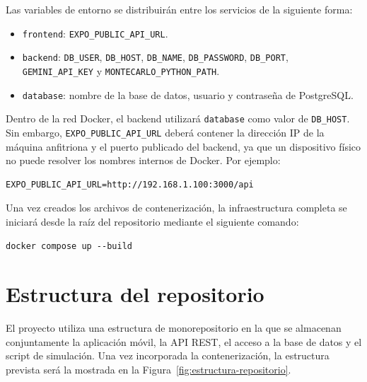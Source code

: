 Las variables de entorno se distribuir\'an entre los servicios de la siguiente
forma:

\begin{itemize}
  \item \texttt{frontend}: \texttt{EXPO\_PUBLIC\_API\_URL}.
  \item \texttt{backend}: \texttt{DB\_USER}, \texttt{DB\_HOST},
        \texttt{DB\_NAME}, \texttt{DB\_PASSWORD}, \texttt{DB\_PORT},
        \texttt{GEMINI\_API\_KEY} y \texttt{MONTECARLO\_PYTHON\_PATH}.
  \item \texttt{database}: nombre de la base de datos, usuario y contrase\~na de
        PostgreSQL.
\end{itemize}

Dentro de la red Docker, el backend utilizar\'a \texttt{database} como valor de
\texttt{DB\_HOST}. Sin embargo, \texttt{EXPO\_PUBLIC\_API\_URL} deber\'a contener
la direcci\'on IP de la m\'aquina anfitriona y el puerto publicado del backend, ya
que un dispositivo f\'isico no puede resolver los nombres internos de Docker. Por
ejemplo:

\begin{lstlisting}
EXPO_PUBLIC_API_URL=http://192.168.1.100:3000/api
\end{lstlisting}

Una vez creados los archivos de contenerizaci\'on, la infraestructura completa se
iniciar\'a desde la ra\'iz del repositorio mediante el siguiente comando:

\begin{lstlisting}
docker compose up --build
\end{lstlisting}

\section{Estructura del repositorio}

El proyecto utiliza una estructura de monorepositorio en la que se almacenan
conjuntamente la aplicaci\'on m\'ovil, la API REST, el acceso a la base de datos y
el script de simulaci\'on. Una vez incorporada la contenerizaci\'on, la estructura
prevista ser\'a la mostrada en la Figura~\ref{fig:estructura-repositorio}.

